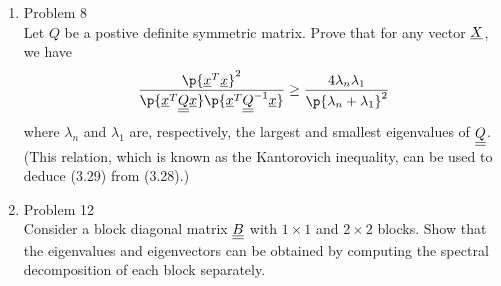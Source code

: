 \documentclass[11pt, oneside]{article}
\begin{document}
\begin{enumerate}
  \item %
    Problem 8 \\
    Let $Q$ be a postive definite symmetric matrix.
    Prove that for any vector $\underline{X}$, we have
    \[
      \frac{\p{\v{x}^T\v{x}}^2}{\p{\v{x}^T \M{Q} \v{x}}\p{\v{x}^T \M{Q}^{-1} \v{x}}}
      \ge \frac{4\lambda_n \lambda_1}{\p{\lambda_n + \lambda_1}^2}
    \]
    where $\lambda_n$ and $\lambda_1$ are, respectively, the largest and
    smallest eigenvalues of $\underline{\underline{Q}}$.
    (This relation, which is known as the Kantorovich inequality, can be used to
    deduce (3.29) from (3.28).)

  \item %
    Problem 12 \\
    Consider a block diagonal matrix $\underline{\underline{B}}$ with $1 \times 1$ and $2 \times 2$
    blocks.
    Show that the eigenvalues and eigenvectors can be obtained by computing the
    spectral decomposition of each block separately.


\end{enumerate}
\end{document}
